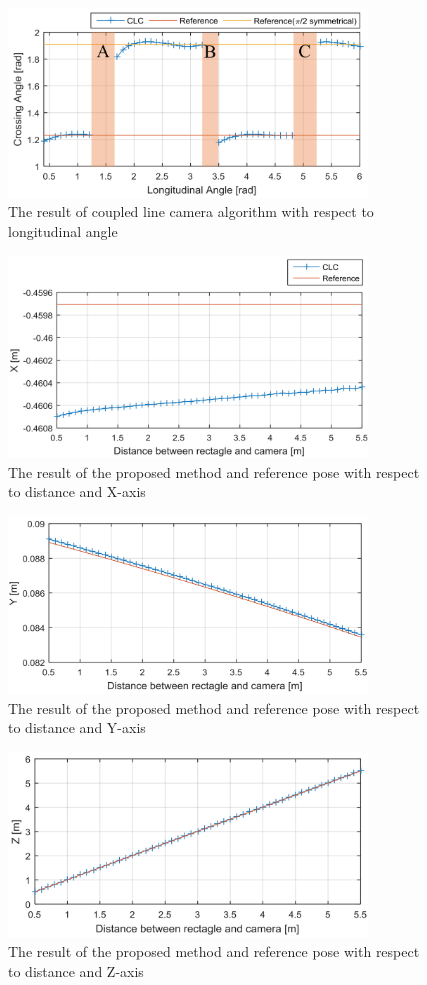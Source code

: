 \documentclass[master,korean,final]{cbnu-ecs}
\begin{document}
\begin{figure}[!ht]
  \centering
	\includegraphics[width=360px]{img/ca_ang.png}
  \caption{The result of coupled line camera algorithm with respect to longitudinal angle }
\label{ca_ang}
\end{figure}
\newpage
\begin{figure}[!ht]
  \centering
	\includegraphics[width=360px]{img/X_d.png}
  \caption{The result of the proposed method and reference pose with respect to distance and X-axis }
\label{X_d}
\end{figure}
\begin{figure}[!ht]
  \centering
	\includegraphics[width=360px]{img/Y_d.png}
  \caption{The result of the proposed method and reference pose with respect to distance and Y-axis }
\label{Y_d}
\end{figure}
\begin{figure}[!ht]
  \centering
	\includegraphics[width=360px]{img/Z_d.png}
  \caption{The result of the proposed method and reference pose with respect to distance and Z-axis }
\label{Z_d}
\end{figure}
\end{document}
